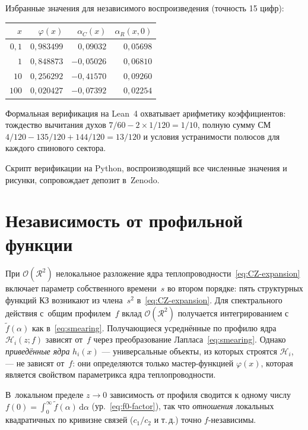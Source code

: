 \documentclass[aps,prd,twocolumn,superscriptaddress,nofootinbib,floatfix]{revtex4-2}
\theoremstyle{definition}
\theoremstyle{remark}
\newcommand{\dd}{\mathrm{d}}
\begin{document}
Избранные значения для независимого воспроизведения (точность 15 цифр):

\begin{center}
\renewcommand{\arraystretch}{1.1}
\begin{tabular}{@{}rrrr@{}}
  \toprule
  $x$ & $\varphi(x)$ & $\alpha_C(x)$ & $\alpha_R(x, 0)$ \\
  \midrule
  $0{,}1$ & $0{,}983499$ & $0{,}09032$ & $0{,}05698$ \\
  $1$ & $0{,}848873$ & $-0{,}05026$ & $0{,}06810$ \\
  $10$ & $0{,}256292$ & $-0{,}41570$ & $0{,}09260$ \\
  $100$ & $0{,}020427$ & $-0{,}07392$ & $0{,}02254$ \\
  \bottomrule
\end{tabular}
\end{center}

Формальная верификация на Lean~4 охватывает арифметику коэффициентов:
тождество вычитания духов $7/60 - 2 \times 1/120 = 1/10$, полную
сумму СМ $4/120 - 135/120 + 144/120 = 13/120$ и условия устранимости
полюсов для каждого спинового сектора.

Скрипт верификации на Python, воспроизводящий все численные значения
и рисунки, сопровождает депозит в~Zenodo.


\section{Независимость от профильной функции}
\label{app:profile}

При $\mathcal{O}(\mathcal{R}^2)$ нелокальное разложение ядра
теплопроводности~\eqref{eq:CZ-expansion} включает параметр собственного
времени~$s$ во втором порядке: пять структурных функций КЗ возникают из
члена~$s^2$ в~\eqref{eq:CZ-expansion}. Для спектрального действия
с~общим профилем~$f$ вклад $\mathcal{O}(\mathcal{R}^2)$ получается
интегрированием с~$\tilde{f}(\alpha)$ как в~\eqref{eq:smearing}.
Получающиеся усреднённые по профилю ядра $\mathcal{H}_i(z; f)$ зависят
от~$f$ через преобразование Лапласа~\eqref{eq:smearing}. Однако
\emph{приведённые ядра} $h_i(x)$ --- универсальные объекты, из которых
строятся $\mathcal{H}_i$, --- не зависят от~$f$: они определяются только
мастер-функцией $\varphi(x)$, которая является свойством параметрикса
ядра теплопроводности.

В~локальном пределе $z \to 0$ зависимость от профиля сводится к одному
числу $f(0) = \int_0^\infty \tilde{f}(\alpha)\,\dd\alpha$
(ур.~\eqref{eq:f0-factor}), так что \emph{отношения} локальных
квадратичных по кривизне связей ($c_1/c_2$ и т.\,д.) точно
$f$-независимы.
\end{document}
